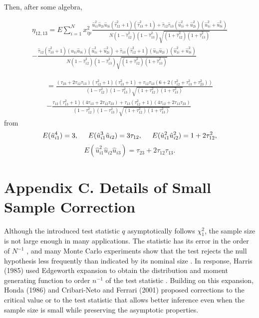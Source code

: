 \documentclass[aap, preprint]{imsart}
\numberwithin{equation}{section}
\theoremstyle{plain}
\begin{document}
 Then, after some algebra,

\begin{equation}
    \begin{multlined}
    \eta_{12,13} = E\sum_{i=1}^{N}x_{ip}^2  \frac{\hat{u}_{i1}^2 \hat{u}_{2i}\hat{u}_{3i}(\hat{\tau}_{12}^2+1)(\hat{\tau}_{13}^2+1)
    + \hat{\tau}_{12}\hat{\tau}_{13} (\hat{u}_{1i}^2 + \hat{u}_{2i}^2)(\hat{u}_{1i}^2 + \hat{u}_{3i}^2)}{N(1-\hat{\tau}_{12}^2)(1-\hat{\tau}_{13}^2)\sqrt{(1+\hat{\tau}_{12}^2)(1+\hat{\tau}_{13}^2)}} \\
    - \frac{\hat{\tau}_{12}(\hat{\tau}_{13}^2 + 1) (\hat{u}_{1i}\hat{u}_{3i})(\hat{u}_{1i}^2 + \hat{u}_{2i}^2) + \hat{\tau}_{13}(\hat{\tau}_{12}^2+1)(\hat{u}_{1i}\hat{u}_{2i})(\hat{u}_{1i}^2 + \hat{u}_{3i}^2)}{N(1-\hat{\tau}_{12}^2)(1-\hat{\tau}_{13}^2)\sqrt{(1+\hat{\tau}_{12}^2)(1+\hat{\tau}_{13}^2)}}
    \end{multlined} 
    \end{equation}
    
\begin{equation} \begin{multlined}
= \frac{(\tau_{23}+2\tau_{12}\tau_{13})(\tau_{12}^2+1)(\tau_{13}^2+1) + \tau_{12}\tau_{13}(6+2(\tau_{12}^2+\tau_{13}^2+\tau_{23}^2))}{(1-{\tau}_{12}^2)(1-{\tau}_{13}^2)\sqrt{(1+{\tau}_{12}^2)(1+{\tau}_{13}^2)}} \\
- \frac{\tau_{12}(\tau_{13}^2+1)(4\tau_{13}+2\tau_{12}\tau_{23}) + \tau_{13}(\tau_{12}^2+1)(4\tau_{12}+2\tau_{13}\tau_{23})}{(1-{\tau}_{12}^2)(1-{\tau}_{13}^2)\sqrt{(1+{\tau}_{12}^2)(1+{\tau}_{13}^2)}}
\end{multlined} \end{equation}
from
$$E(\hat{u}_{i1}^4) = 3, \hspace{5mm} E(\hat{u}_{i1}^3 \hat{u}_{i2}) = 3\tau_{12}, \hspace{5mm} E(\hat{u}_{i1}^2\hat{u}_{i2}^2) = 1 + 2\tau_{12}^2,$$
$$E(\hat{u}_{i1}^2 \hat{u}_{i2} \hat{u}_{i3}) = \tau_{23} + 2\tau_{12}\tau_{13}.$$

\section{Appendix C. Details of Small Sample Correction}
Although the introduced test statistic $q$ asymptotically follows $\chi_1^2$, the sample size is not large enough in many applications. The statistic has its error in the order of $N^{-1}$ \cite{harris1985asymptotic}, and many Monte Carlo experiments show that the test rejects the null hypothesis less frequently than indicated by its nominal size \cite{godfrey1978testing, griffiths1986monte, honda1988size} . In response, Harris (1985) used Edgeworth expansion to obtain the distribution and moment generating function to order $n^{-1}$ of the test statistic \cite{harris1985asymptotic}. Building on this expansion, Honda (1986) and Cribari-Neto and Ferrari (2001) proposed corrections to the critical value or to the test statistic that allows better inference even when the sample size is small while preserving the asymptotic properties. \cite{cribari1995improved, cribari2001monotonic, honda1988size}\\
\end{document}
